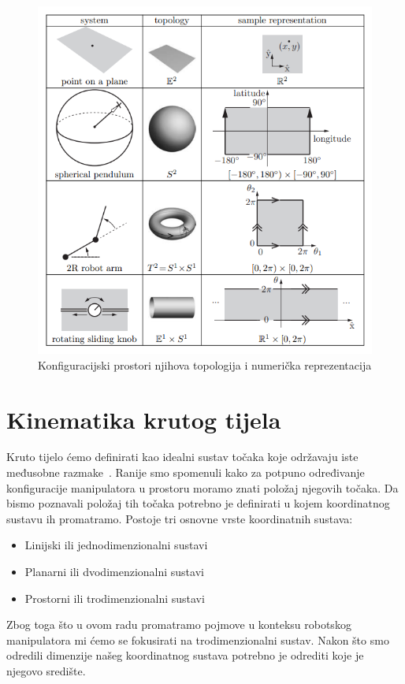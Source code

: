 \documentclass[times, utf8, diplomskirad]{fer}
\begin{document}
\begin{figure}[H]
    \centering
    \includegraphics[width=12cm]{img/configuration-topology}
    \caption{Konfiguracijski prostori njihova topologija i numerička reprezentacija}
    \label{fig:configuration-topology}
\end{figure}

\section{Kinematika krutog tijela} \label{section:kin-krutog-tijela}
Kruto tijelo ćemo definirati kao idealni sustav točaka koje održavaju iste međusobne razmake~\cite{defKrutogTijela}.
Ranije smo spomenuli kako za potpuno određivanje konfiguracije manipulatora u prostoru moramo znati položaj njegovih točaka.
Da bismo poznavali položaj tih točaka potrebno je definirati u kojem koordinatnog sustavu ih promatramo.
Postoje tri osnovne vrste koordinatnih sustava:
\begin{itemize}
  \item Linijski ili jednodimenzionalni sustavi
  \item Planarni ili dvodimenzionalni sustavi
  \item Prostorni ili trodimenzionalni sustavi
\end{itemize}
\newpage
Zbog toga što u ovom radu promatramo pojmove u konteksu robotskog manipulatora mi ćemo se fokusirati na trodimenzionalni sustav.
Nakon što smo odredili dimenzije našeg koordinatnog sustava potrebno je odrediti koje je njegovo središte.
\end{document}
